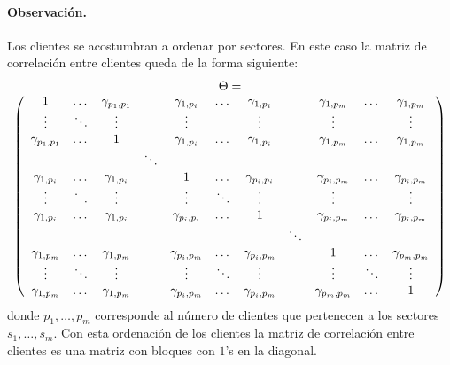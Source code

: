 \paragraph{Observaci\'on.} Los clientes se acostumbran a ordenar por sectores. En este
caso la matriz de correlaci\'on entre clientes queda de la forma siguiente:
\begin{displaymath}
\begin{array}{c}
\Theta = \\
\left(
\begin{array}{ccccccccccc}
1                & \dots    & \gamma_{p_1,p_1}  &          & \gamma_{1,p_i}   & \dots   & \gamma_{1,p_i}    &         & \gamma_{1,p_m}   & \dots      & \gamma_{1,p_m}   \cr
\vdots           & \ddots   & \vdots            &          & \vdots           &         & \vdots            &         & \vdots           &            & \vdots           \cr
\gamma_{p_1,p_1} & \dots    & 1                 &          & \gamma_{1,p_i}   & \dots   & \gamma_{1,p_i}    &         & \gamma_{1,p_m}   & \dots      & \gamma_{1,p_m}   \cr

                 &          &                   & \ddots   &                  &         &                   &         &                  &            &                  \cr

\gamma_{1,p_i}   & \dots    & \gamma_{1,p_i}    &          & 1                & \dots   & \gamma_{p_i,p_i}  &         & \gamma_{p_i,p_m} & \dots      & \gamma_{p_i,p_m} \cr
\vdots           & \ddots   & \vdots            &          & \vdots           & \ddots  & \vdots            &         & \vdots           &            & \vdots           \cr
\gamma_{1,p_i}   & \dots    & \gamma_{1,p_i}    &          & \gamma_{p_i,p_i} & \dots   & 1                 &         & \gamma_{p_i,p_m} & \dots      & \gamma_{p_i,p_m} \cr

                 &          &                   &          &                  &         &                   & \ddots  &                  &            &                  \cr

\gamma_{1,p_m}   & \dots    & \gamma_{1,p_m}    &          & \gamma_{p_i,p_m} & \dots   & \gamma_{p_i,p_m}  &         & 1                & \dots      & \gamma_{p_m,p_m} \cr
\vdots           & \ddots   & \vdots            &          & \vdots           & \ddots  & \vdots            &         & \vdots           & \ddots     & \vdots           \cr
\gamma_{1,p_m}   & \dots    & \gamma_{1,p_m}    &          & \gamma_{p_i,p_m} & \dots   & \gamma_{p_i,p_m}  &         & \gamma_{p_m,p_m} & \dots      & 1               
\end{array}
\right)
\end{array}
\end{displaymath}
donde $p_1, \dots, p_m$ corresponde al n\'umero de clientes que pertenecen a los sectores
$s_1, \dots, s_m$. Con esta ordenaci\'on de los clientes la matriz de correlaci\'on entre
clientes es una matriz con bloques con $1$'s en la diagonal.


